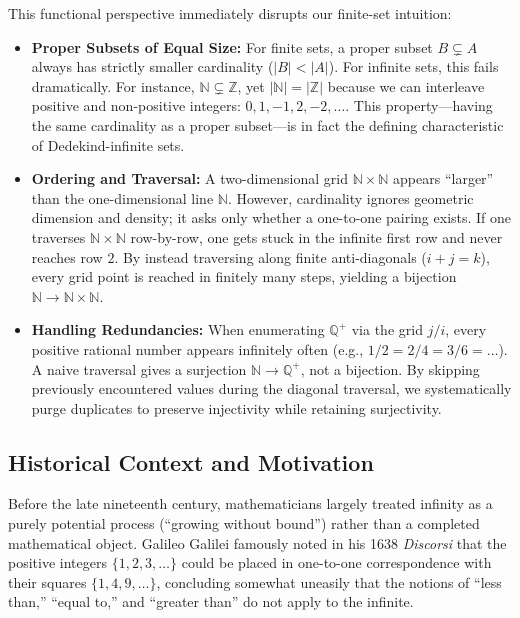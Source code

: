 \documentclass[11pt, letterpaper]{article}
\theoremstyle{definition}
\theoremstyle{remark}
\begin{document}
This functional perspective immediately disrupts our finite-set intuition:
\begin{itemize}
    \item \textbf{Proper Subsets of Equal Size:} For finite sets, a proper subset $B \subsetneq A$ always has strictly smaller cardinality ($|B| < |A|$). For infinite sets, this fails dramatically. For instance, $\mathbb{N} \subsetneq \mathbb{Z}$, yet $|\mathbb{N}| = |\mathbb{Z}|$ because we can interleave positive and non-positive integers: $0, 1, -1, 2, -2, \dots$. This property---having the same cardinality as a proper subset---is in fact the defining characteristic of Dedekind-infinite sets.
    \item \textbf{Ordering and Traversal:} A two-dimensional grid $\mathbb{N} \times \mathbb{N}$ appears ``larger'' than the one-dimensional line $\mathbb{N}$. However, cardinality ignores geometric dimension and density; it asks only whether a one-to-one pairing exists. If one traverses $\mathbb{N} \times \mathbb{N}$ row-by-row, one gets stuck in the infinite first row and never reaches row $2$. By instead traversing along finite anti-diagonals ($i + j = k$), every grid point is reached in finitely many steps, yielding a bijection $\mathbb{N} \to \mathbb{N} \times \mathbb{N}$.
    \item \textbf{Handling Redundancies:} When enumerating $\mathbb{Q}^+$ via the grid $j/i$, every positive rational number appears infinitely often (e.g., $1/2 = 2/4 = 3/6 = \dots$). A naive traversal gives a surjection $\mathbb{N} \to \mathbb{Q}^+$, not a bijection. By skipping previously encountered values during the diagonal traversal, we systematically purge duplicates to preserve injectivity while retaining surjectivity.
\end{itemize}

\subsection{Historical Context and Motivation}

Before the late nineteenth century, mathematicians largely treated infinity as a purely potential process (``growing without bound'') rather than a completed mathematical object. Galileo Galilei famously noted in his 1638 \textit{Discorsi} that the positive integers $\{1, 2, 3, \dots\}$ could be placed in one-to-one correspondence with their squares $\{1, 4, 9, \dots\}$, concluding somewhat uneasily that the notions of ``less than,'' ``equal to,'' and ``greater than'' do not apply to the infinite.
\end{document}
